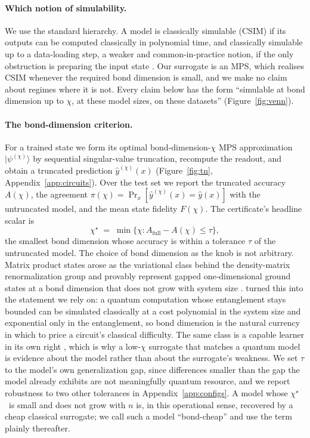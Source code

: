 \documentclass[10pt]{article}
\newcommand{\chistar}{\ensuremath{\chi^\star}}
\begin{document}
\paragraph{Which notion of simulability.} We use the standard hierarchy. A model is classically
simulable (CSIM) if its outputs can be computed classically in polynomial time, and classically
simulable up to a data-loading step, a weaker and common-in-practice notion, if the only
obstruction is preparing the input state \citep{cerezo2025,shin2024}. Our surrogate is an MPS,
which realises CSIM whenever the required bond dimension is small, and we make no claim about
regimes where it is not. Every claim below has the form ``simulable at bond dimension up to $\chi$,
at these model sizes, on these datasets'' (Figure~\ref{fig:venn}).


\paragraph{The bond-dimension criterion.} For a trained state we form its optimal
bond-dimension-$\chi$ MPS approximation $|\psi^{(\chi)}\rangle$ by sequential singular-value
truncation, recompute the readout, and obtain a truncated prediction $\hat y^{(\chi)}(x)$
(Figure~\ref{fig:tn}, Appendix~\ref{app:circuits}). Over the test set we report the truncated accuracy $A(\chi)$, the agreement
$\pi(\chi)=\Pr_x[\hat y^{(\chi)}(x)=\hat y(x)]$ with the untruncated model, and the mean state
fidelity $F(\chi)$. The certificate's headline scalar is
\begin{equation}
\chistar \;=\; \min\{\chi : A_{\mathrm{full}}-A(\chi)\le\tau\},
\label{eq:chistar}
\end{equation}
the smallest bond dimension whose accuracy is within a tolerance $\tau$ of the untruncated model.
The choice of bond dimension as the knob is not arbitrary. Matrix product states arose as the
variational class behind the density-matrix renormalization group \citep{white1992,schollwock2011,
orus2014} and provably represent gapped one-dimensional ground states at a bond dimension that does
not grow with system size \citep{verstraete2006}. \citet{vidal2003} turned this into the statement
we rely on: a quantum computation whose entanglement stays bounded can be simulated classically at
a cost polynomial in the system size and exponential only in the entanglement, so bond dimension is
the natural currency in which to price a circuit's classical difficulty. The same class is a
capable learner in its own right \citep{stoudenmire2016}, which is why a low-$\chi$ surrogate that
matches a quantum model is evidence about the model rather than about the surrogate's weakness.
We set $\tau$ to the model's own generalization gap, since differences smaller than the gap the
model already exhibits are not meaningfully quantum resource, and we report robustness to two other
tolerances in Appendix~\ref{app:configs}. A model whose \chistar\ is small and does not grow with
$n$ is, in this operational sense, recovered by a cheap classical surrogate; we call such a model
``bond-cheap'' and use the term plainly thereafter.
\end{document}
